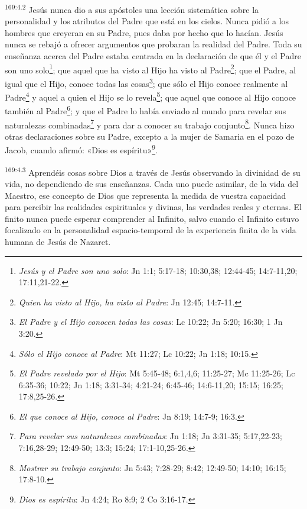 \par 
\textsuperscript{169:4.2} Jesús nunca dio a sus apóstoles una lección sistemática sobre la personalidad y los atributos del Padre que está en los cielos. Nunca pidió a los hombres que creyeran en su Padre, pues daba por hecho que lo hacían. Jesús nunca se rebajó a ofrecer argumentos que probaran la realidad del Padre. Toda su enseñanza acerca del Padre estaba centrada en la declaración de que él y el Padre son uno solo\footnote{\textit{Jesús y el Padre son uno solo}: Jn 1:1; 5:17-18; 10:30,38; 12:44-45; 14:7-11,20; 17:11,21-22.}; que aquel que ha visto al Hijo ha visto al Padre\footnote{\textit{Quien ha visto al Hijo, ha visto al Padre}: Jn 12:45; 14:7-11.}; que el Padre, al igual que el Hijo, conoce todas las cosas\footnote{\textit{El Padre y el Hijo conocen todas las cosas}: Lc 10:22; Jn 5:20; 16:30; 1 Jn 3:20.}; que sólo el Hijo conoce realmente al Padre\footnote{\textit{Sólo el Hijo conoce al Padre}: Mt 11:27; Lc 10:22; Jn 1:18; 10:15.} y aquel a quien el Hijo se lo revela\footnote{\textit{El Padre revelado por el Hijo}: Mt 5:45-48; 6:1,4,6; 11:25-27; Mc 11:25-26; Lc 6:35-36; 10:22; Jn 1:18; 3:31-34; 4:21-24; 6:45-46; 14:6-11,20; 15:15; 16:25; 17:8,25-26.}; que aquel que conoce al Hijo conoce también al Padre\footnote{\textit{El que conoce al Hijo, conoce al Padre}: Jn 8:19; 14:7-9; 16:3.}; y que el Padre lo había enviado al mundo para revelar sus naturalezas combinadas\footnote{\textit{Para revelar sus naturalezas combinadas}: Jn 1:18; Jn 3:31-35; 5:17,22-23; 7:16,28-29; 12:49-50; 13:3; 15:24; 17:1-10,25-26.} y para dar a conocer su trabajo conjunto\footnote{\textit{Mostrar su trabajo conjunto}: Jn 5:43; 7:28-29; 8:42; 12:49-50; 14:10; 16:15; 17:8-10.}. Nunca hizo otras declaraciones sobre su Padre, excepto a la mujer de Samaria en el pozo de Jacob, cuando afirmó: «Dios es espíritu»\footnote{\textit{Dios es espíritu}: Jn 4:24; Ro 8:9; 2 Co 3:16-17.}.

\par 
\textsuperscript{169:4.3} Aprendéis cosas sobre Dios a través de Jesús observando la divinidad de su vida, no dependiendo de sus enseñanzas. Cada uno puede asimilar, de la vida del Maestro, ese concepto de Dios que representa la medida de vuestra capacidad para percibir las realidades espirituales y divinas, las verdades reales y eternas. El finito nunca puede esperar comprender al Infinito, salvo cuando el Infinito estuvo focalizado en la personalidad espacio-temporal de la experiencia finita de la vida humana de Jesús de Nazaret.


